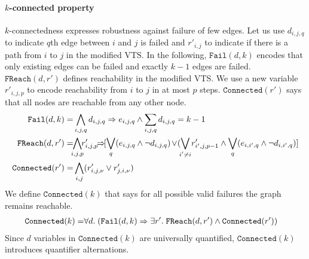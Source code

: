 \paragraph{$k$-connected property}
%
$k$-connectedness expresses robustness against failure of few edges.
%
Let us use $d_{i,j,q}$ to indicate $q$th edge between $i$ and $j$ is failed
and $r'_{i,j}$ to indicate if there is a path from $i$ to $j$ in
the modified VTS.
%
%
In the following, $\texttt{Fail}(d,k)$ encodes that only
existing edges can be failed and exactly $k-1$ edges are failed.
%
$\texttt{FReach}(d,r')$ defines reachability in the modified VTS.
%
We use a new variable $r'_{i,j,p}$ to encode reachability from
$i$ to $j$ in at most $p$ steps.
%
$\texttt{Connected}(r')$ says that all nodes are reachable from any
other node.
\begin{align*}
\texttt{Fail}(d,k) = & 
\bigwedge\limits_{i,j,q} d_{i,j,q} \limplies e_{i,j,q}  \land 
\sum_{i,j,q} d_{i,j,q} = k-1\\
\texttt{FReach}(d,r') = &\hspace{-1ex}
\bigwedge\limits_{i,j,p}  \hspace{-1ex}r^{\prime}_{i,j,p} \hspace{-1ex}\limplies\hspace{-1ex} [\bigvee_{q} (e_{i,j,q} \land  \neg d_{i,j,q}) \hspace{-1pt}\lor \hspace{-2pt} (\bigvee_{\mathclap{i' \neq i}}  r^{\prime}_{i',j,p-1} \land  \bigvee_{q} (e_{i,i',q} \land \neg d_{i,i',q}) ]\\
\texttt{Connected}(r') = & \Land\limits_{i,j} (r^{\prime}_{i,j,\nu} \lor r^{\prime}_{j,i,\nu})
\end{align*}
%
We define $\texttt{Connected}(k)$ that says for all possible valid failures
the graph remains reachable. 
\begin{align*}
\texttt{Connected}(k) = & \forall d.\;
(\texttt{Fail}(d,k) \Rightarrow \exists r'.\;\texttt{FReach}(d,r')
\land \texttt{Connected}(r'))
\end{align*}
Since $d$ variables in $\texttt{Connected}(k)$ are universally
quantified, $\texttt{Connected}(k)$ introduces quantifier alternations.
%
%

